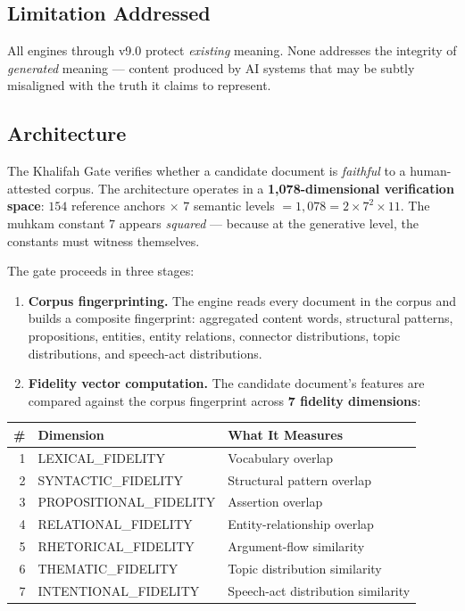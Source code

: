 \documentclass[11pt,a4paper]{article}
\begin{document}
\subsection{Limitation Addressed}

All engines through v9.0 protect \textit{existing} meaning. None addresses the integrity of \textit{generated} meaning --- content produced by AI systems that may be subtly misaligned with the truth it claims to represent.

\subsection{Architecture}

The Khalifah Gate verifies whether a candidate document is \textit{faithful} to a human-attested corpus. The architecture operates in a \textbf{1,078-dimensional verification space}: $154$ reference anchors $\times$ $7$ semantic levels $= 1{,}078 = 2 \times 7^2 \times 11$. The muhkam constant $7$ appears \textit{squared} --- because at the generative level, the constants must witness themselves.

The gate proceeds in three stages:

\begin{enumerate}[nosep]
    \item \textbf{Corpus fingerprinting.} The engine reads every document in the corpus and builds a composite fingerprint: aggregated content words, structural patterns, propositions, entities, entity relations, connector distributions, topic distributions, and speech-act distributions.

    \item \textbf{Fidelity vector computation.} The candidate document's features are compared against the corpus fingerprint across \textbf{7 fidelity dimensions}:
\end{enumerate}

\begin{center}
\small
\begin{tabular}{rll}
\toprule
\textbf{\#} & \textbf{Dimension} & \textbf{What It Measures} \\
\midrule
1 & LEXICAL\_FIDELITY & Vocabulary overlap \\
2 & SYNTACTIC\_FIDELITY & Structural pattern overlap \\
3 & PROPOSITIONAL\_FIDELITY & Assertion overlap \\
4 & RELATIONAL\_FIDELITY & Entity-relationship overlap \\
5 & RHETORICAL\_FIDELITY & Argument-flow similarity \\
6 & THEMATIC\_FIDELITY & Topic distribution similarity \\
7 & INTENTIONAL\_FIDELITY & Speech-act distribution similarity \\
\bottomrule
\end{tabular}
\end{center}
\end{document}

